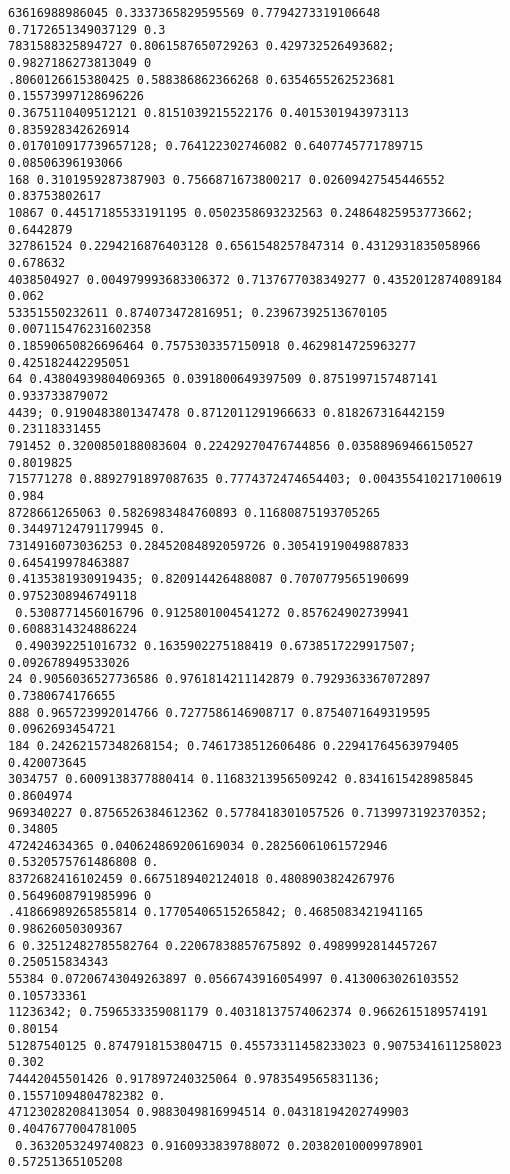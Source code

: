 \documentclass[12pt,a4paper]{article}
\begin{document}
\begin{lstlisting}
63616988986045 0.3337365829595569 0.7794273319106648 0.7172651349037129 0.3
7831588325894727 0.8061587650729263 0.429732526493682; 0.9827186273813049 0
.8060126615380425 0.588386862366268 0.6354655262523681 0.15573997128696226 
0.3675110409512121 0.8151039215522176 0.4015301943973113 0.835928342626914 
0.017010917739657128; 0.764122302746082 0.6407745771789715 0.08506396193066
168 0.3101959287387903 0.7566871673800217 0.02609427545446552 0.83753802617
10867 0.44517185533191195 0.0502358693232563 0.24864825953773662; 0.6442879
327861524 0.2294216876403128 0.6561548257847314 0.4312931835058966 0.678632
4038504927 0.004979993683306372 0.7137677038349277 0.4352012874089184 0.062
53351550232611 0.874073472816951; 0.23967392513670105 0.007115476231602358 
0.18590650826696464 0.7575303357150918 0.4629814725963277 0.425182442295051
64 0.43804939804069365 0.0391800649397509 0.8751997157487141 0.933733879072
4439; 0.9190483801347478 0.8712011291966633 0.818267316442159 0.23118331455
791452 0.3200850188083604 0.22429270476744856 0.03588969466150527 0.8019825
715771278 0.8892791897087635 0.7774372474654403; 0.004355410217100619 0.984
8728661265063 0.5826983484760893 0.11680875193705265 0.34497124791179945 0.
7314916073036253 0.28452084892059726 0.30541919049887833 0.645419978463887 
0.4135381930919435; 0.820914426488087 0.7070779565190699 0.9752308946749118
 0.5308771456016796 0.9125801004541272 0.857624902739941 0.6088314324886224
 0.490392251016732 0.1635902275188419 0.6738517229917507; 0.092678949533026
24 0.9056036527736586 0.9761814211142879 0.7929363367072897 0.7380674176655
888 0.965723992014766 0.7277586146908717 0.8754071649319595 0.0962693454721
184 0.24262157348268154; 0.7461738512606486 0.22941764563979405 0.420073645
3034757 0.6009138377880414 0.11683213956509242 0.8341615428985845 0.8604974
969340227 0.8756526384612362 0.5778418301057526 0.7139973192370352; 0.34805
472424634365 0.040624869206169034 0.28256061061572946 0.5320575761486808 0.
8372682416102459 0.6675189402124018 0.4808903824267976 0.5649608791985996 0
.41866989265855814 0.17705406515265842; 0.4685083421941165 0.98626050309367
6 0.32512482785582764 0.22067838857675892 0.4989992814457267 0.250515834343
55384 0.07206743049263897 0.0566743916054997 0.4130063026103552 0.105733361
11236342; 0.7596533359081179 0.40318137574062374 0.9662615189574191 0.80154
51287540125 0.8747918153804715 0.45573311458233023 0.9075341611258023 0.302
74442045501426 0.917897240325064 0.9783549565831136; 0.15571094804782382 0.
47123028208413054 0.9883049816994514 0.04318194202749903 0.4047677004781005
 0.3632053249740823 0.9160933839788072 0.20382010009978901 0.57251365105208

\end{lstlisting}
\end{document}
